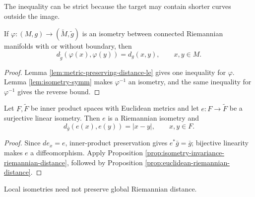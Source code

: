 The inequality can be strict because the target may contain shorter curves outside the image.

\begin{proposition}
\label{prop:isometry-invariance-riemannian-distance}





If $\varphi:(M,g)\to(\widetilde M,\widetilde g)$ is an isometry between connected Riemannian manifolds with or without boundary, then
\[
d_{\widetilde g}(\varphi(x),\varphi(y))=d_g(x,y),
\qquad x,y\in M.
\]
\end{proposition}
\begin{proof}

\sketch Lemma \ref{lem:metric-preserving-distance-le} gives one inequality for $\varphi$. Lemma \ref{lem:isometry-symm} makes $\varphi^{-1}$ an isometry, and the same inequality for $\varphi^{-1}$ gives the reverse bound.
\end{proof}

\begin{proposition}
\label{prop:euclidean-linear-isometry-distance}





Let $F,\widetilde F$ be inner product spaces with Euclidean metrics and let $e:F\to\widetilde F$ be a surjective linear isometry. Then $e$ is a Riemannian isometry and
\[
d_{\bar g}(e(x),e(y))=|x-y|,
\qquad x,y\in F.
\]
\end{proposition}
\begin{proof}

\sketch Since $de_x=e$, inner-product preservation gives $e^*\bar g=\bar g$; bijective linearity makes $e$ a diffeomorphism. Apply Proposition \ref{prop:isometry-invariance-riemannian-distance}, followed by Proposition \ref{prop:euclidean-riemannian-distance}.
\end{proof}

Local isometries need not preserve global Riemannian distance.

